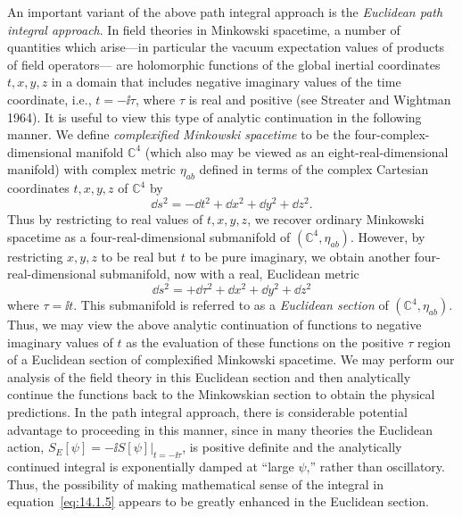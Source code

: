 An important variant of the above path integral approach is the \emph{Euclidean path
integral approach}. In field theories in Minkowski spacetime, a number of quantities
which arise---in particular the vacuum expectation values of products of field operators---
are holomorphic functions of the global inertial coordinates \(t,x,y,z\) in a
domain that includes negative imaginary values of the time coordinate, i.e.,
\(t=-\ii\tau\), where \(\tau\) is real and positive (see Streater and Wightman 1964). It is
useful to view this type of analytic continuation in the following manner. We define
\emph{complexified Minkowski spacetime} to be the four-complex-dimensional manifold
\(\mathbb C^4\) (which also may be viewed as an eight-real-dimensional manifold) with
complex metric \(\eta_{ab}\) defined in terms of the complex Cartesian coordinates
\(t,x,y,z\) of \(\mathbb C^4\) by
\begin{equation}
  \dd s^2=-\dd t^2+\dd x^2+\dd y^2+\dd z^2.
  \tag{14.1.7}\label{eq:14.1.7}
\end{equation}
Thus by restricting to real values of \(t,x,y,z\), we recover ordinary Minkowski
spacetime as a four-real-dimensional submanifold of \((\mathbb C^4,\eta_{ab})\). However,
by restricting \(x,y,z\) to be real but \(t\) to be pure imaginary, we obtain another
four-real-dimensional submanifold, now with a real, Euclidean metric
\begin{equation}
  \dd s^2=+\dd\tau^2+\dd x^2+\dd y^2+\dd z^2
  \tag{14.1.8}\label{eq:14.1.8}
\end{equation}
where \(\tau=\ii t\). This submanifold is referred to as a \emph{Euclidean section} of
\((\mathbb C^4,\eta_{ab})\). Thus, we may view the above analytic continuation of
functions to negative imaginary values of \(t\) as the evaluation of these functions on
the positive \(\tau\) region of a Euclidean section of complexified Minkowski spacetime.
We may perform our analysis of the field theory in this Euclidean section and then
analytically continue the functions back to the Minkowskian section to obtain the
physical predictions. In the path integral approach, there is considerable potential
advantage to proceeding in this manner, since in many theories the Euclidean action,
\(S_E[\psi]=-\ii S[\psi]\rvert_{t=-\ii\tau}\), is positive definite and the analytically
continued integral is exponentially damped at ``large \(\psi\),'' rather than oscillatory.
Thus, the possibility of making mathematical sense of the integral in
equation~\eqref{eq:14.1.5} appears to be greatly enhanced in the Euclidean section.

